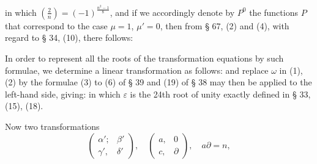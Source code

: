in which $\left(\frac{2}{n}\right) = (-1)^{\frac{n^2-1}{8}}$, and if we accordingly denote by $P^0$ the functions $P$ that correspond to the case $\mu = 1$, $\mu' = 0$, then from § 67, (2) and (4), with regard to § 34, (10), there follows:

In order to represent all the roots of the transformation equations by such formulae, we determine a linear transformation as follows:
and replace $\omega$ in (1), (2) by
the formulae (3) to (6) of § 39 and (19) of § 38 may then be applied to the left-hand side, giving:
in which $\varepsilon$ is the 24th root of unity exactly defined in § 33, (15), (18).

Now two transformations
\[
\begin{pmatrix}\alpha'; & \beta'\\ \gamma', & \delta'\end{pmatrix}, \quad \begin{pmatrix}a, & 0\\ c, & \partial\end{pmatrix}, \quad a\partial = n,
\]
